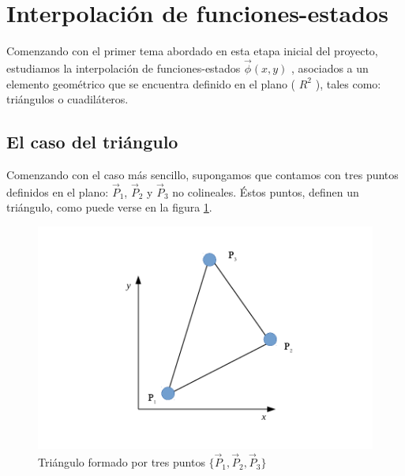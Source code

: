 \section{Interpolación de funciones-estados}

Comenzando con el primer tema abordado en esta etapa inicial del proyecto, estudiamos la interpolación de funciones-estados $\vec{ \phi } (x,y)$ , asociados a un elemento geométrico que se encuentra definido en el plano ( $R^2$ ), tales como: triángulos o cuadiláteros.

\subsection{El caso del triángulo}
\label{sec:triangulos}
Comenzando con el caso más sencillo, supongamos que contamos con tres puntos definidos en el plano: $ \vec{P}_{1} $, $ \vec{P}_{2} $ y $ \vec{P}_{3} $ no colineales. Éstos puntos, definen un triángulo, como puede verse en la figura \ref{fig:tri_simple}.

\begin{figure}
\centering
\includegraphics[scale=.8]{triangulo_simple.pdf}
\caption{\label{fig:tri_simple} Triángulo formado por tres puntos $ \lbrace \vec{P}_{1}, \vec{P}_{2}, \vec{P}_{3}  \rbrace $}
\end{figure}

